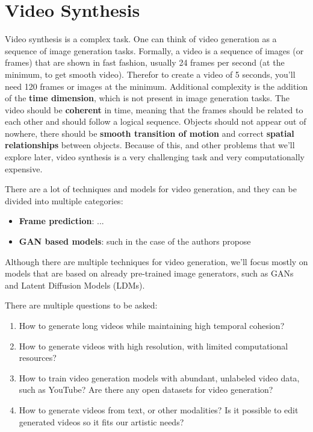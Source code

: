 \section{Video Synthesis}
\label{sec:video_synthesis}

Video synthesis is a complex task. One can think of video generation as a sequence of image generation tasks. Formally, a video is a sequence of images (or frames) that are shown in fast fashion, usually 24 frames per second (at the minimum, to get smooth video). Therefor to create a video of 5 seconds, you'll need 120 frames or images at the minimum. Additional complexity is the addition of the \textbf{time dimension}, which is not present in image generation tasks. The video should be \textbf{coherent} in time, meaning that the frames should be related to each other and should follow a logical sequence. Objects should not appear out of nowhere, there should be \textbf{smooth transition of motion} and correct \textbf{spatial relationships} between objects. Because of this, and other problems that we'll explore later, video synthesis is a very challenging task and very computationally expensive.

There are a lot of techniques and models for video generation, and they can be divided into multiple categories:

\begin{itemize}
    \item \textbf{Frame prediction}: ...
    \item \textbf{GAN based models}: such in the case of \cite{chu2020learning} the authors propose 
\end{itemize}

Although there are multiple techniques for video generation, we'll focus mostly on models that are based on already pre-trained image generators, such as GANs and Latent Diffusion Models (LDMs).

There are multiple questions to be asked:

\begin{enumerate}
    \item How to generate long videos while maintaining high temporal cohesion?
    \item How to generate videos with high resolution, with limited computational resources?
    \item How to train video generation models with abundant, unlabeled video data, such as YouTube? Are there any open datasets for video generation?
    \item How to generate videos from text, or other modalities? Is it possible to edit generated videos so it fits our artistic needs?
\end{enumerate}




